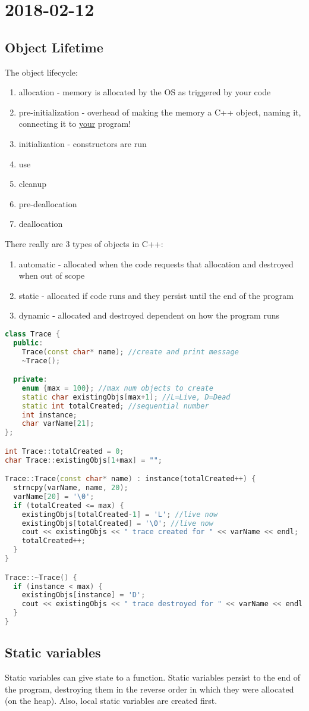 \section{2018-02-12}

\subsection{Object Lifetime}

The object lifecycle:

\begin{enumerate}
  \item allocation - memory is allocated by the OS as triggered by your code
  \item pre-initialization - overhead of making the memory a C++ object, naming it, connecting it to \underline{your} program!
  \item initialization - constructors are run
  \item use
  \item cleanup
  \item pre-deallocation
  \item deallocation
\end{enumerate}

There really are 3 types of objects in C++:

\begin{enumerate}
  \item automatic - allocated when the code requests that allocation and destroyed when out of scope
  \item static - allocated if code runs and they persist until the end of the program
  \item dynamic - allocated and destroyed dependent on how the program runs
\end{enumerate}

\begin{lstlisting}[language=C++]
class Trace {
  public:
    Trace(const char* name); //create and print message
    ~Trace();    

  private:
    enum {max = 100}; //max num objects to create
    static char existingObjs[max+1]; //L=Live, D=Dead
    static int totalCreated; //sequential number
    int instance;
    char varName[21];
};

int Trace::totalCreated = 0;
char Trace::existingObjs[1+max] = "";

Trace::Trace(const char* name) : instance(totalCreated++) {
  strncpy(varName, name, 20);
  varName[20] = '\0';
  if (totalCreated <= max) {
    existingObjs[totalCreated-1] = 'L'; //live now
    existingObjs[totalCreated] = '\0'; //live now
    cout << existingObjs << " trace created for " << varName << endl;
    totalCreated++;
  }
}

Trace::~Trace() {
  if (instance < max) {
    existingObjs[instance] = 'D';
    cout << existingObjs << " trace destroyed for " << varName << endl;
  } 
}
\end{lstlisting}

\subsection{Static variables}

Static variables can give state to a function. Static variables persist to the end of the program, destroying them in the reverse order in which they were allocated (on the heap). Also, local static variables are created first.
